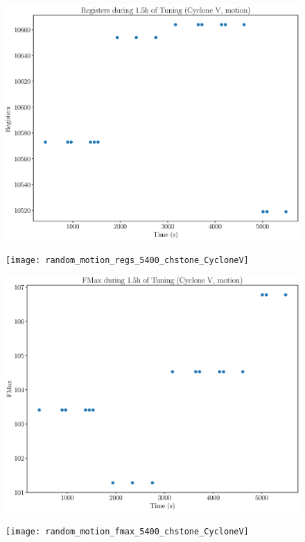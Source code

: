 \documentclass[12pt, a4paper]{article}
\begin{document}
\begin{figure}[htpb]
    \begin{minipage}{.48\textwidth}
        \includegraphics[scale=.25]{motion_regs_5400_chstone_CycloneV}
    \end{minipage}%
    \hfill
    \begin{minipage}{.48\textwidth}
        \texttt{[image: random\_motion\_regs\_5400\_chstone\_CycloneV]}
    \end{minipage}%

    \begin{minipage}{.48\textwidth}
        \includegraphics[scale=.25]{motion_fmax_5400_chstone_CycloneV}
    \end{minipage}%
    \hfill
    \begin{minipage}{.48\textwidth}
        \texttt{[image: random\_motion\_fmax\_5400\_chstone\_CycloneV]}
    \end{minipage}%
\end{figure}
\end{document}
